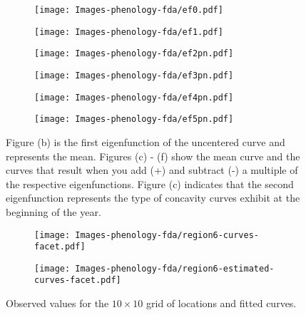 \begin{figure}
	
	\centering 
	\begin{subfigure}
		[b]{0.32 
		\textwidth} \centering 
		\texttt{[image: Images-phenology-fda/ef0.pdf]} \caption{} \label{} 
	\end{subfigure}
	
	\begin{subfigure}
		[b]{0.32 
		\textwidth} \centering 
		\texttt{[image: Images-phenology-fda/ef1.pdf]} \caption{} \label{} 
	\end{subfigure}
	\begin{subfigure}
		[b]{0.32 
		\textwidth} \centering 
		\texttt{[image: Images-phenology-fda/ef2pn.pdf]} \caption{} \label{} 
	\end{subfigure}
	
	\begin{subfigure}
		[b]{0.32 
		\textwidth} \centering 
		\texttt{[image: Images-phenology-fda/ef3pn.pdf]} \caption{} \label{} 
	\end{subfigure}
	\begin{subfigure}
		[b]{0.32 
		\textwidth} \centering 
		\texttt{[image: Images-phenology-fda/ef4pn.pdf]} \caption{} \label{} 
	\end{subfigure}
	
	\begin{subfigure}
		[b]{0.32 
		\textwidth} \centering 
		\texttt{[image: Images-phenology-fda/ef5pn.pdf]} \caption{} \label{} 
	\end{subfigure}
	\caption{Figure (b) is the first eigenfunction of the uncentered curve and represents the mean. Figures (c) - (f) show the mean curve and the curves that result when you add (+) and subtract (-) a multiple of the respective eigenfunctions. Figure (c) indicates that the second eigenfunction represents the type of concavity curves exhibit at the beginning of the year.} \label{fig:interpreting eigenfunctions} 
\end{figure}
\begin{figure}
	\centering 
	\begin{subfigure}
		[b]{0.5 
		\textwidth} \centering 
		\texttt{[image: Images-phenology-fda/region6-curves-facet.pdf]} 
	\end{subfigure}
	
	\begin{subfigure}
		[b]{0.5 
		\textwidth} \centering 
		\texttt{[image: Images-phenology-fda/region6-estimated-curves-facet.pdf]} 
	\end{subfigure}
	\caption{Observed values for the $10\times 10$ grid of locations and fitted curves.} \label{fig:estimated curves} 
\end{figure}
